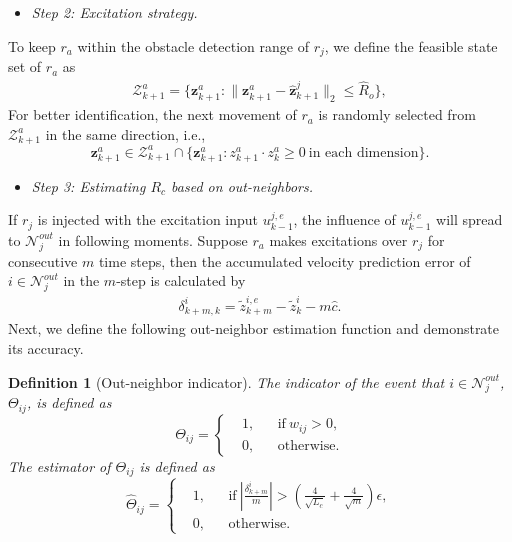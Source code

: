 \documentclass[12pt,journal,draftclsnofoot,onecolumn]{IEEEtran}
\newtheorem{definition}{Definition}
\begin{document}
\begin{itemize}
\item \textit{Step 2: Excitation strategy.}
\end{itemize}

To keep $r_a$ within the obstacle detection range of $r_j$, we define the feasible state set of $r_a$ as  
\begin{align}
\mathcal{Z}_{k+1}^{a}= \{  {\mathbf z}_{k+1}^{a}: \| {\mathbf z}_{k+1}^{a} -{\hat{\mathbf z}}_{k+1}^{j} \|_2 \le \hat{R}_o \}, 
\end{align}
For better identification, the next movement of $r_a$ is randomly selected from $\mathcal{Z}_{k+1}^{a}$ in the same direction, i.e., 
\begin{equation}\label{eq:update-rule}
{\mathbf z}_{k+1}^{a} \!\in\! \mathcal{Z}_{k+1}^{a}\! \cap \! \{ {\mathbf z}_{k+1}^{a} : {z}_{k+1}^{a}\cdot {z}_{k}^{a} \ge 0~\text{in each dimension}\}. \!\!
\end{equation}

\begin{itemize}
\item \textit{Step 3: Estimating $R_c$ based on out-neighbors.}
\end{itemize}

If $r_j$ is injected with the excitation input $u_{k-1}^{j,e}$, the influence of $u_{k-1}^{j,e}$ will spread to $\mathcal{N}_{j}^{out}$ in following moments. 
Suppose $r_a$ makes excitations over $r_j$ for consecutive $m$ time steps, then the accumulated velocity prediction error of $i\in\mathcal{N}_{j}^{out}$ in the $m$-step is calculated by 
\begin{align}\label{eq:state-increment}
\delta_{k+m,k}^{i}= \tilde z_{k+m}^{i,e} - \tilde z_{k}^{i} - m \hat c .
\end{align}
Next, we define the following out-neighbor estimation function and demonstrate its accuracy. 
\begin{definition}[Out-neighbor indicator]\label{def:indicator}
The indicator of the event that $i\in \mathcal{N}_j^{out}$, $\Theta_{ij}$, is defined as 
\begin{equation}
\Theta_{ij}=\left \{
\begin{aligned}
&1, &&\text{if}~w_{ij}>0, \\
&0, &&\text{otherwise}. 
\end{aligned} \right.
\end{equation}
The estimator of $\Theta_{ij}$ is defined as 
\begin{equation}
\hat{\Theta}_{ij}=\left \{
\begin{aligned}
&1, &&\text{if}~|\frac{\delta_{k+m}^{i}}{m} |>(\frac{4}{\sqrt{L_c}} + \frac{4}{\sqrt{m}})\epsilon, \\
&0, &&\text{otherwise}. 
\end{aligned}\right.
\end{equation}
\end{definition}
\end{document}
